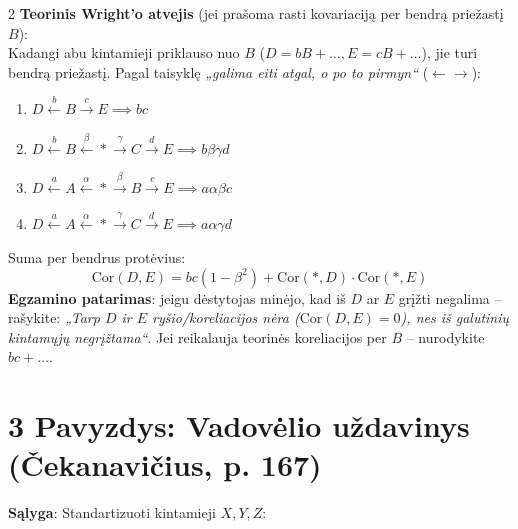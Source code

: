 \documentclass[9pt,a4paper]{article}
\begin{document}
\begin{multicols*}{2}
\textbf{Teorinis Wright'o atvejis} (jei prašoma rasti kovariaciją per bendrą priežastį $B$):\\
Kadangi abu kintamieji priklauso nuo $B$ ($D = bB+\dots, E = cB+\dots$), jie turi bendrą priežastį. Pagal taisyklę \textit{„galima eiti atgal, o po to pirmyn“} ($\leftarrow \to$):
\begin{enumerate}
    \item $D \xleftarrow{b} B \xrightarrow{c} E \implies b c$
    \item $D \xleftarrow{b} B \xleftarrow{\beta} * \xrightarrow{\gamma} C \xrightarrow{d} E \implies b \beta \gamma d$
    \item $D \xleftarrow{a} A \xleftarrow{\alpha} * \xrightarrow{\beta} B \xrightarrow{c} E \implies a \alpha \beta c$
    \item $D \xleftarrow{a} A \xleftarrow{\alpha} * \xrightarrow{\gamma} C \xrightarrow{d} E \implies a \alpha \gamma d$
\end{enumerate}
Suma per bendrus protėvius:
\begin{equation*}
    \text{Cor}(D, E) = b c (1 - \beta^2) + \text{Cor}(*, D) \cdot \text{Cor}(*, E)
\end{equation*}
\textbf{Egzamino patarimas}: jeigu dėstytojas minėjo, kad iš $D$ ar $E$ grįžti negalima – rašykite: \textit{„Tarp $D$ ir $E$ ryšio/koreliacijos nėra ($\text{Cor}(D, E) = 0$), nes iš galutinių kintamųjų negrįžtama“}. Jei reikalauja teorinės koreliacijos per $B$ – nurodykite $bc + \dots$.

\section{3 Pavyzdys: Vadovėlio uždavinys (Čekanavičius, p. 167)}
\textbf{Sąlyga}:
Standartizuoti kintamieji $X, Y, Z$:

\begin{center}
%
\end{center}


\end{multicols*}
\end{document}
